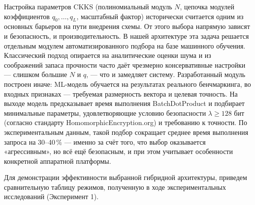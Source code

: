 \documentclass[a4paper, 12pt, oneside, openany]{article}
\begin{document}
Настройка параметров CKKS (полиномиальный модуль $N$, цепочка модулей коэффициентов $q_0, \ldots, q_L$, масштабный фактор) исторически считается одним из основных барьеров на пути внедрения схемы. От этого выбора напрямую зависят и безопасность, и производительность. В нашей архитектуре эта задача решается отдельным модулем автоматизированного подбора на базе машинного обучения. Классический подход опирается на аналитические оценки шума и из соображений запаса прочности часто даёт чрезмерно консервативные настройки — слишком большие $N$ и $q$, — что и замедляет систему. Разработанный модуль построен иначе: ML-модель обучается на результатах реального бенчмаркинга, во входных признаках — требуемая размерность вектора и целевая точность. На выходе модель предсказывает время выполнения BatchDotProduct и подбирает минимальные параметры, удовлетворяющие условию безопасности $\lambda \geq 128$ бит (согласно стандарту HomomorphicEncryption.org) и требованию к точности. По экспериментальным данным, такой подбор сокращает среднее время выполнения запроса на 30–40\,\% — именно за счёт того, что выбор оказывается «агрессивным», но всё ещё безопасным, и при этом учитывает особенности конкретной аппаратной платформы.

Для демонстрации эффективности выбранной гибридной архитектуры, приведем сравнительную таблицу режимов, полученную в ходе экспериментальных исследований (Эксперимент 1).
\end{document}
